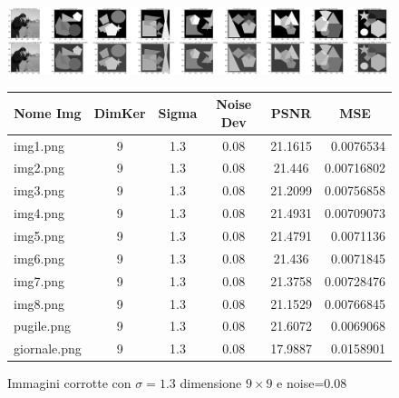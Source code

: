 \begin{figure}[H]
    \centering
    \begin{minipage}[h]{\textwidth}
    \includegraphics[width=\linewidth]{output/tabCorrotte/imgcorr13.png}\label{fig:imgcorrotte9x90.08}
    \end{minipage}
    \begin{minipage}[h]{\textwidth}
        \centering
        
        \begin{tabular}{|l c c c c r|}
            \hline
            \multicolumn{1}{|c}{\textbf{Nome Img}} & \multicolumn{1}{|c}{\textbf{DimKer}} & \multicolumn{1}{|c}{\textbf{Sigma}} & \multicolumn{1}{|c}{\textbf{Noise Dev}} & \multicolumn{1}{|c}{\textbf{PSNR}} & \multicolumn{1}{|c|}{\textbf{MSE}} \\ \hline
                img1.png & 9 & 1.3 & 0.08 & 21.1615 & 0.0076534 \\
                img2.png & 9 & 1.3 & 0.08 & 21.446 & 0.00716802 \\
                img3.png & 9 & 1.3 & 0.08 & 21.2099 & 0.00756858 \\
                img4.png & 9 & 1.3 & 0.08 & 21.4931 & 0.00709073 \\
                img5.png & 9 & 1.3 & 0.08 & 21.4791 & 0.0071136 \\
                img6.png & 9 & 1.3 & 0.08 & 21.436 & 0.0071845 \\
                img7.png & 9 & 1.3 & 0.08 & 21.3758 & 0.00728476 \\
                img8.png & 9 & 1.3 & 0.08 & 21.1529 & 0.00766845 \\
                pugile.png & 9 & 1.3 & 0.08 & 21.6072 & 0.0069068\\
                giornale.png & 9 & 1.3 & 0.08 & 17.9887 & 0.0158901 \\ \hline
            \end{tabular}\label{tab:tabcorrotte9x90.08}
        
        \end{minipage}
    \captionsetup{labelformat=andtable}
    \caption{Immagini corrotte con $\sigma = 1.3$ dimensione $9 \times 9$ e noise=0.08}
\end{figure}

